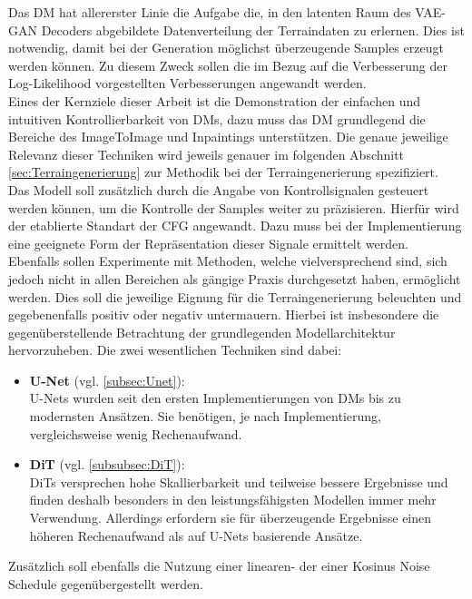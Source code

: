 Das DM hat allererster Linie die Aufgabe die, in den latenten Raum des VAE-GAN Decoders abgebildete Datenverteilung der Terraindaten zu erlernen.  Dies ist notwendig, damit bei der Generation möglichst überzeugende Samples erzeugt werden können. Zu diesem Zweck sollen die im Bezug auf die Verbesserung der Log-Likelihood vorgestellten Verbesserungen angewandt werden. \\
Eines der Kernziele dieser Arbeit ist die Demonstration der einfachen und intuitiven Kontrollierbarkeit von DMs, dazu muss das DM grundlegend die Bereiche des ImageToImage und Inpaintings unterstützen. Die genaue jeweilige Relevanz dieser Techniken wird jeweils genauer im folgenden Abschnitt \ref{sec:Terraingenerierung} zur Methodik bei der Terraingenerierung spezifiziert. \\
Das Modell soll zusätzlich durch die Angabe von Kontrollsignalen gesteuert werden können, um die Kontrolle der Samples weiter zu präzisieren. Hierfür wird der etablierte Standart der CFG angewandt. Dazu muss bei der Implementierung eine geeignete Form der Repräsentation dieser Signale ermittelt werden. \\
Ebenfalls sollen Experimente mit Methoden, welche vielversprechend sind, sich jedoch nicht in allen Bereichen als gängige Praxis durchgesetzt haben, ermöglicht werden. Dies soll die jeweilige Eignung für die Terraingenerierung beleuchten und gegebenenfalls positiv oder negativ untermauern. Hierbei ist insbesondere die gegenüberstellende Betrachtung der grundlegenden Modellarchitektur hervorzuheben. Die zwei wesentlichen Techniken sind dabei:  
\begin{itemize}
    \item \textbf{U-Net} (vgl. \ref{subsec:Unet}): \\
    U-Nets wurden seit den ersten Implementierungen von DMs bis zu modernsten Ansätzen. Sie benötigen, je nach Implementierung, vergleichsweise wenig Rechenaufwand. 
    \item \textbf{DiT} (vgl. \ref{subsubsec:DiT}): \\
    DiTs versprechen hohe Skallierbarkeit und teilweise bessere Ergebnisse und finden deshalb besonders in den leistungsfähigsten Modellen immer mehr Verwendung. Allerdings erfordern sie für überzeugende Ergebnisse einen höheren Rechenaufwand als auf U-Nets basierende Ansätze. 
\end{itemize}
Zusätzlich soll ebenfalls die Nutzung einer linearen- der einer Kosinus Noise Schedule gegenübergestellt werden. 


